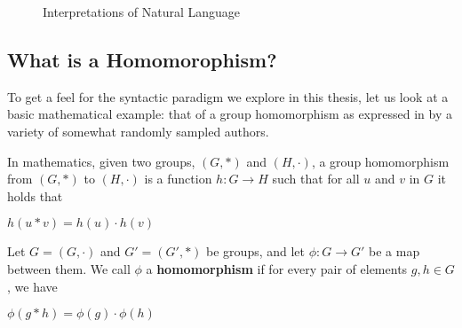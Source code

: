 \begin{figure}[H]
\centering
{}
\caption{Interpretations of Natural Language} \label{fig:M3}
\end{figure}

\subsection{What is a Homomorophism?}

To get a feel for the syntactic paradigm we explore in this thesis, let us look at a basic mathematical
example: that of a group homomorphism as expressed in by a variety of somewhat
randomly sampled authors.  


\begin{definition}
In mathematics, given two groups, $(G, \ast)$ and $(H, \cdot)$, a group homomorphism from $(G, \ast)$ to $(H, \cdot)$ is a function $h : G \to H$ such that for all $u$ and $v$ in $G$ it holds that

\begin{center}
  $h(u \ast v) = h ( u ) \cdot h ( v )$ 
\end{center}
\end{definition}


\begin{definition}
Let $G = (G,\cdot)$ and $G' = (G',\ast)$ be groups, and let $\phi : G \to G'$ be a map between them. We call $\phi$ a \textbf{homomorphism} if for every pair of elements $g, h \in G$, we have 
\begin{center}
  $\phi(g \ast h) = \phi ( g ) \cdot \phi ( h )$ 
\end{center}
\end{definition}

